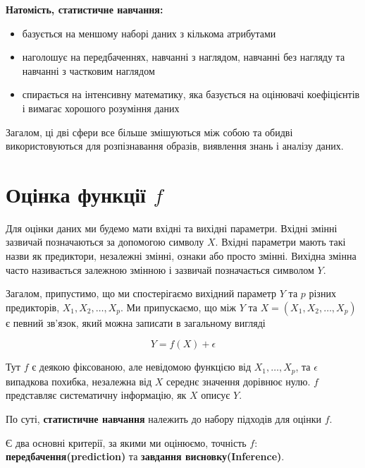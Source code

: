 \documentclass[14pt,a4paper]{extarticle}
\newcounter{e}
\numberwithin{equation}{section}
\numberwithin{figure}{section}
\begin{document}
    \textbf{Натомість, статистичне навчання:}
    
    \begin{itemize}
        \item базується на меншому наборі даних з кількома атрибутами
        \item наголошує на передбаченнях, навчанні з наглядом, навчанні без нагляду та навчанні з частковим наглядом
        \item спирається на інтенсивну математику, яка базується на оцінювачі коефіцієнтів і вимагає хорошого розуміння даних
    \end{itemize}

    Загалом, ці дві сфери все більше змішуються між собою та обидві використовуються для розпізнавання образів, виявлення знань і аналізу даних.

    \newpage
    \thispagestyle{empty}
    \section{Оцінка функції $f$}
    
    Для оцінки даних ми будемо мати вхідні та вихідні параметри. Вхідні змінні зазвичай позначаються за допомогою символу $X$. Вхідні параметри мають такі назви як предиктори, незалежні змінні, ознаки або просто змінні. Вихідна змінна часто називається залежною змінною і зазвичай позначається символом $Y$. \newline
    
    Загалом, припустимо, що ми спостерігаємо вихідний параметр $Y$ та $p$ різних предикторів, $X_{1}, X_{2}, \ldots, X_{p}$. Ми припускаємо, що між $Y$ та $X=\left(X_{1}, X_{2}, \ldots, X_{p}\right)$ є певний зв’язок, який можна записати в загальному вигляді
    
    $$
    Y=f(X)+\epsilon
    $$
    
    Тут $f$ є деякою фіксованою, але невідомою функцією від $X_{1}, \ldots, X_{p}$, та $\epsilon$ випадкова похибка, незалежна від $X$ середнє значення дорівнює нулю. $f$ представляє систематичну інформацію, як $X$ описує $Y$. \newline
    
    По суті, \textbf{статистичне навчання} належить до набору підходів для оцінки $f$. \newline
    
    Є два основні критерії, за якими ми оцінюємо, точність $f$: \textbf{передбачення(prediction)} та \textbf{завдання висновку(Inference)}. \newline
	
\end{document}
